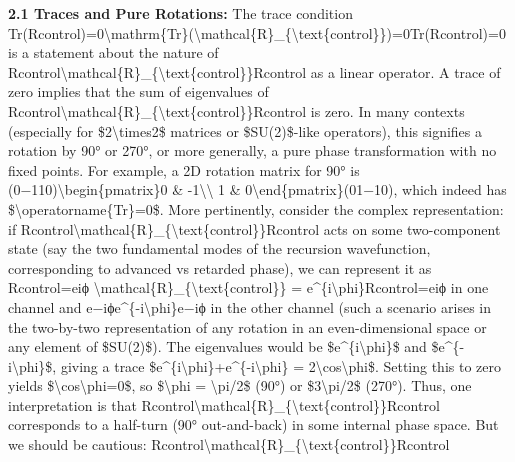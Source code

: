 \documentclass[
]{article}
\begin{document}
\textbf{2.1 Traces and Pure Rotations:} The trace condition
Tr(Rcontrol)=0\textbackslash mathrm\{Tr\}(\textbackslash mathcal\{R\}\_\{\textbackslash text\{control\}\})=0Tr(Rcontrol\hspace{0pt})=0
is a statement about the nature of
Rcontrol\textbackslash mathcal\{R\}\_\{\textbackslash text\{control\}\}Rcontrol\hspace{0pt}
as a linear operator. A trace of zero implies that the sum of
eigenvalues of
Rcontrol\textbackslash mathcal\{R\}\_\{\textbackslash text\{control\}\}Rcontrol\hspace{0pt}
is zero. In many contexts (especially for \$2\textbackslash times2\$
matrices or \$SU(2)\$-like operators), this signifies a rotation by 90°
or 270°, or more generally, a pure phase transformation with no fixed
points. For example, a 2D rotation matrix for 90° is
(0−110)\textbackslash begin\{pmatrix\}0 \&
-1\textbackslash\textbackslash{} 1 \&
0\textbackslash end\{pmatrix\}(01\hspace{0pt}−10\hspace{0pt}), which
indeed has \$\textbackslash operatorname\{Tr\}=0\$. More pertinently,
consider the complex representation: if
Rcontrol\textbackslash mathcal\{R\}\_\{\textbackslash text\{control\}\}Rcontrol\hspace{0pt}
acts on some two-component state (say the two fundamental modes of the
recursion wavefunction, corresponding to advanced vs retarded phase), we
can represent it as Rcontrol=eiϕ
\textbackslash mathcal\{R\}\_\{\textbackslash text\{control\}\} =
e\^{}\{i\textbackslash phi\}Rcontrol\hspace{0pt}=eiϕ in one channel and
e−iϕe\^{}\{-i\textbackslash phi\}e−iϕ in the other channel (such a
scenario arises in the two-by-two representation of any rotation in an
even-dimensional space or any element of \$SU(2)\$). The eigenvalues
would be \$e\^{}\{i\textbackslash phi\}\$ and
\$e\^{}\{-i\textbackslash phi\}\$, giving a trace
\$e\^{}\{i\textbackslash phi\}+e\^{}\{-i\textbackslash phi\} =
2\textbackslash cos\textbackslash phi\$. Setting this to zero yields
\$\textbackslash cos\textbackslash phi=0\$, so \$\textbackslash phi =
\textbackslash pi/2\$ (90°) or \$3\textbackslash pi/2\$ (270°). Thus,
one interpretation is that
Rcontrol\textbackslash mathcal\{R\}\_\{\textbackslash text\{control\}\}Rcontrol\hspace{0pt}
corresponds to a half-turn (90° out-and-back) in some internal phase
space. But we should be cautious:
Rcontrol\textbackslash mathcal\{R\}\_\{\textbackslash text\{control\}\}Rcontrol\hspace{0pt}
\end{document}
